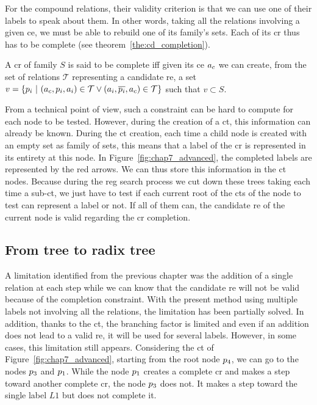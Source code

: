 For the compound relations, their validity criterion is that we can use one of their labels to speak about them. In other words, taking all the relations involving a given \acrshort{ce}, we must be able to rebuild one of its family's sets. Each of its \acrshort{cr} thus has to be complete (see theorem~\ref{the:cd_completion}).

\begin{theorem} 
\label{the:cd_completion}
A \acrshort{cr} of family $S$ is said to be complete iff given its \acrshort{ce} $a_c$ we can create, from the set of relations $\mathcal{T}$ representing a candidate \acrshort{re}, a set $v = \{p_i\ |\ (a_c, p_i, a_i) \in \mathcal{T} \lor (a_i, \overline{p_i}, a_c) \in \mathcal{T} \}$ such that $v \subset S$.
\end{theorem}

From a technical point of view, such a constraint can be hard to compute for each node to be tested. However, during the creation of a \acrshort{ct}, this information can already be known. During the \acrshort{ct} creation, each time a child node is created with an empty set as family of sets, this means that a label of the \acrshort{cr} is represented in its entirety at this node. In Figure~\ref{fig:chap7_advanced}, the completed labels are represented by the red arrows. We can thus store this information in the \acrshort{ct} nodes. Because during the \acrshort{reg} search process we cut down these trees taking each time a sub-\acrshort{ct}, we just have to test if each current root of the \acrshort{ct}s of the node to test can represent a label or not. If all of them can, the candidate \acrshort{re} of the current node is valid regarding the \acrshort{cr} completion.

\subsection{From tree to radix tree}

A limitation identified from the previous chapter was the addition of a single relation at each step while we can know that the candidate \acrshort{re} will not be valid because of the completion constraint. With the present method using multiple labels not involving all the relations, the limitation has been partially solved. In addition, thanks to the \acrshort{ct}, the branching factor is limited and even if an addition does not lead to a valid \acrshort{re}, it will be used for several labels. However, in some cases, this limitation still appears. Considering the \acrlong{ct} of Figure~\ref{fig:chap7_advanced}, starting from the root node $p_4$, we can go to the nodes $p_3$ and $p_1$. While the node $p_1$ creates a complete \acrshort{cr} and makes a step toward another complete \acrshort{cr}, the node $p_3$ does not. It makes a step toward the single label $L1$ but does not complete it.

